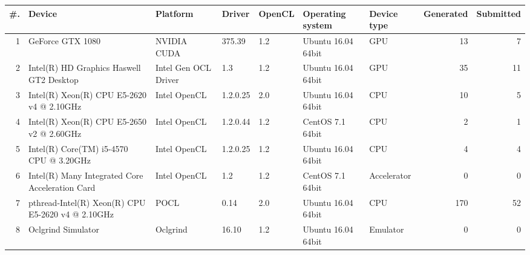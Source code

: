 \begin{tabular}{rllllllrr}
\toprule
 \#. &                                             Device &              Platform &    Driver & OpenCL &    Operating system &  Device type &  Generated &  Submitted \\
\midrule
  1 &                                   GeForce GTX 1080 &           NVIDIA CUDA &    375.39 &    1.2 &  Ubuntu 16.04 64bit &          GPU &         13 &          7 \\
  2 &           Intel(R) HD Graphics Haswell GT2 Desktop &  Intel Gen OCL Driver &       1.3 &    1.2 &  Ubuntu 16.04 64bit &          GPU &         35 &         11 \\
  3 &          Intel(R) Xeon(R) CPU E5-2620 v4 @ 2.10GHz &          Intel OpenCL &  1.2.0.25 &    2.0 &  Ubuntu 16.04 64bit &          CPU &         10 &          5 \\
  4 &          Intel(R) Xeon(R) CPU E5-2650 v2 @ 2.60GHz &          Intel OpenCL &  1.2.0.44 &    1.2 &    CentOS 7.1 64bit &          CPU &          2 &          1 \\
  5 &            Intel(R) Core(TM) i5-4570 CPU @ 3.20GHz &          Intel OpenCL &  1.2.0.25 &    1.2 &  Ubuntu 16.04 64bit &          CPU &          4 &          4 \\
  6 &    Intel(R) Many Integrated Core Acceleration Card &          Intel OpenCL &       1.2 &    1.2 &    CentOS 7.1 64bit &  Accelerator &          0 &          0 \\
  7 &  pthread-Intel(R) Xeon(R) CPU E5-2620 v4 @ 2.10GHz &                  POCL &      0.14 &    2.0 &  Ubuntu 16.04 64bit &          CPU &        170 &         52 \\
  8 &                                 Oclgrind Simulator &              Oclgrind &     16.10 &    1.2 &  Ubuntu 16.04 64bit &     Emulator &          0 &          0 \\
\bottomrule
\end{tabular}
